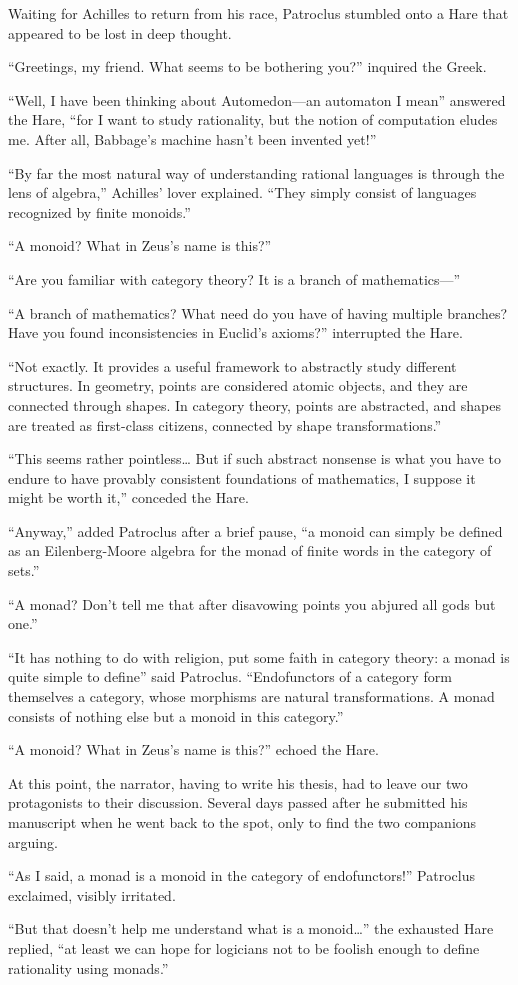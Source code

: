 Waiting for Achilles to return from his race, Patroclus stumbled onto a Hare that appeared to be lost in deep thought.
\par ``Greetings, my friend. What seems to be bothering you?'' inquired the Greek.
\par ``Well, I have been thinking about Automedon---an automaton I mean'' answered the Hare, ``for I want to study rationality, but the notion of computation eludes me. After all, Babbage’s machine hasn't been invented yet!''
\par ``By far the most natural way of understanding rational languages is through the lens of algebra,'' Achilles’ lover explained. ``They simply consist of languages recognized by finite monoids.''
\par ``A monoid? What in Zeus's name is this?''
\par ``Are you familiar with category theory? It is a branch of mathematics---''
\par ``A branch of mathematics? What need do you have of having multiple branches? Have you found inconsistencies in Euclid’s axioms?'' interrupted the Hare.
\par ``Not exactly. It provides a useful framework to abstractly study different structures. In geometry, points are considered atomic objects, and they are connected through shapes. In category theory, points are abstracted, and shapes are treated as first-class citizens, connected by shape transformations.''
\par ``This seems rather pointless… But if such abstract nonsense is what you have to endure to have provably consistent foundations of mathematics, I suppose it might be worth it,'' conceded the Hare.
\par ``Anyway,'' added Patroclus after a brief pause, ``a monoid can simply be defined as an Eilenberg-Moore algebra for the monad of finite words in the category of sets.'' 
\par ``A monad? Don’t tell me that after disavowing points you abjured all gods but one.''
\par ``It has nothing to do with religion, put some faith in category theory: a monad is quite simple to define'' said Patroclus. ``Endofunctors of a category form themselves a category, whose morphisms are natural transformations. A monad consists of nothing else but a monoid in this category.''
\par ``A monoid? What in Zeus's name is this?'' echoed the Hare.

At this point, the narrator, having to write his thesis, had to leave our two protagonists to their discussion. Several days passed after he submitted his manuscript when he went back to the spot, only to find the two companions arguing.
\par ``As I said, a monad is a monoid in the category of endofunctors!'' Patroclus exclaimed, visibly irritated.
\par ``But that doesn’t help me understand what is a monoid…'' the exhausted Hare replied, ``at least we can hope for logicians not to be foolish enough to define rationality using monads.''
